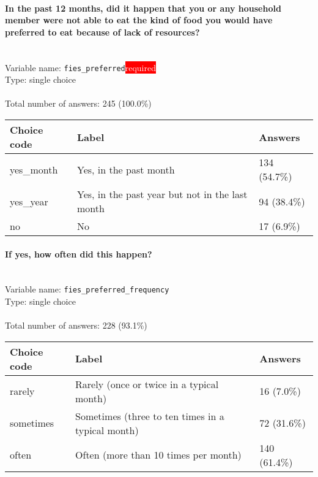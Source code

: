 \documentclass[11.5pt, a4paper]{scrartcl}
\begin{document}
\paragraph{In the past 12 months, did it happen that you or any household member were not able to eat the kind of food you would have preferred to eat because of lack of resources?}
\  \\Variable name: \texttt{fies\_preferred}\hfill\colorbox{red}{\small{\textcolor{white}{required}}}\\
 Type: single choice\\
\\Total number of answers: 245 (100.0\%)
\\[0.2em] \begin{tabular}{p{4cm}|p{8cm}|p{3cm}}
Choice code & Label & Answers \\
\hline
yes\_month & Yes, in the past month& \cellcolor{color2}134 (54.7\%)\\
\cellcolor{mygray} yes\_year & \cellcolor{mygray}Yes, in the past year but not in the last month & \cellcolor{color1}94 (38.4\%)\\
no & No& \cellcolor{color0}17 (6.9\%)\\
\end{tabular}
\paragraph{If yes, how often did this happen? }
\  \\Variable name: \texttt{fies\_preferred\_frequency}\\
Type: single choice\\
\\Total number of answers: 228 (93.1\%)
\\[0.2em] \begin{tabular}{p{4cm}|p{8cm}|p{3cm}}
Choice code & Label & Answers \\
\hline
rarely & Rarely (once or twice in a typical month)& \cellcolor{color0}16 (7.0\%)\\
\cellcolor{mygray} sometimes & \cellcolor{mygray}Sometimes (three to ten times in a typical month) & \cellcolor{color1}72 (31.6\%)\\
often & Often (more than 10 times per month)& \cellcolor{color3}140 (61.4\%)\\
\end{tabular}
\end{document}
